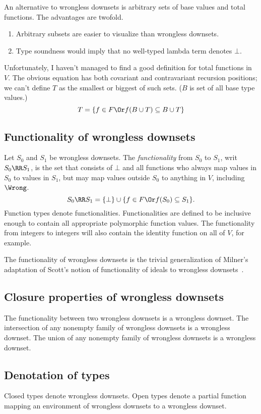 \documentclass{amsart}
\theoremstyle{definition}
\begin{document}
An alternative to wrongless downsets is arbitrary sets of base
values and total functions. The advantages are twofold.
\begin{enumerate}
\item Arbitrary subsets are easier to visualize than wrongless
downsets.
\item Type soundness would imply that no well-typed lambda term
denotes $\bot$.
\end{enumerate}
Unfortunately, I haven't managed to find a good definition for
total functions in $V$. The obvious equation has both covariant
and contravariant recursion positions; we can't define $T$ as the
smallest or biggest of such sets. ($B$ is set of all base type
values.)
\[
T=\{f\in F \Or f(B\cup T)\subseteq B\cup T\}
\]

\subsection{Functionality of wrongless downsets}
\label{functionality}
Let $S_0$ and $S_1$ be wrongless downsets. The
\emph{functionality} from $S_0$ to $S_1$, writ $S_0\RR S_1$, is
the set that consists of $\bot$ and all functions who always map
values in $S_0$ to values in $S_1$, but may map values outside
$S_0$ to anything in $V$, including $\Wrong$.
\[
S_0 \RR S_1 =
\{\bot\}\cup\{f\in F \Or f(S_0) \subseteq S_1\}.
\]
Function types denote functionalities. Functionalities are
defined to be inclusive enough to contain all appropriate
polymorphic function values. The functionality from integers to
integers will also contain the identity function on all of $V$,
for example.

The functionality of wrongless down\-sets is the trivial
generalization of Milner's adaptation of Scott's notion of
functionality of ideals to wrongless downsets~\cite{Milner78}.

\subsection{Closure properties of wrongless downsets}
The functionality between two wrongless downsets is a wrongless
downset. The intersection of any nonempty family of wrongless
downsets is a wrongless downset. The union of any nonempty family
of wrongless downsets is a wrongless downset.

\subsection{Denotation of types}
\label{denotation-types}
Closed types denote wrongless downsets. Open types denote a
partial function mapping an environment of wrongless downsets to
a wrongless downset.
\end{document}
